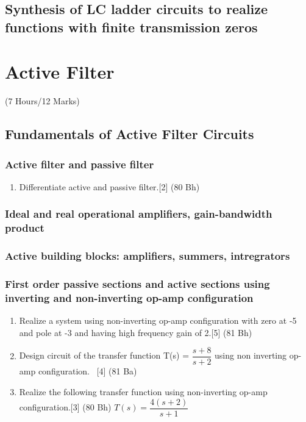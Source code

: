 \documentclass[12pt]{article}
\begin{document}
\subsection{Synthesis of LC ladder circuits to realize functions with finite transmission zeros}

\pagebreak
\section{Active Filter}
\begin{center}(7 Hours/12 Marks)\end{center}
\subsection{Fundamentals of Active Filter Circuits}
\subsubsection{Active filter and passive filter}
\begin{enumerate}
\item Differentiate active and passive filter.\hfill [2] (80 Bh)
\end{enumerate}
\subsubsection{Ideal and real operational amplifiers, gain-bandwidth product}
\subsubsection{Active building blocks: amplifiers, summers, intregrators}
\subsubsection{First order passive sections and active sections using inverting and non-inverting op-amp configuration}
\begin{enumerate}
\item Realize a system using non-inverting op-amp configuration with zero at -5 and pole at -3 and having high frequency gain of 2.\hfill[5] (81 Bh)
\item Design circuit of the transfer function T(s) = $\dfrac{s+8}{s+2}$ using non inverting op-amp configuration. \textcolor{white}{1}\hfill [4] (81 Ba)
\item Realize the following transfer function using non-inverting op-amp configuration.\hfill [3] (80 Bh)
$T(s) = \dfrac{4(s+2)}{s+1}$
\end{enumerate}
\end{document}
